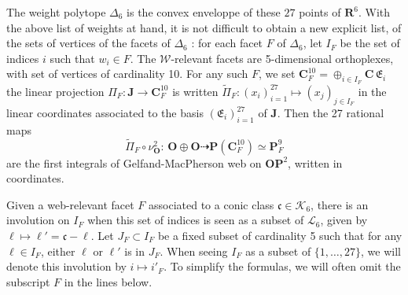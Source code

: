 \documentclass[11pt]{amsart}
\begin{document}
The weight polytope $\Delta_6$ is the convex enveloppe of these $27$ points of $\mathbf R^6$.  With the above list of weights at hand, it is not difficult to obtain a new explicit list, of the sets of vertices of the facets of 
$\Delta_6$ : for each facet $F$ of $\Delta_6$, let $I_F$ be the set of indices 
$i$ such that $w_i\in F$.  The $\boldsymbol{\mathcal W}$-relevant facets are 5-dimensional orthoplexes, with set of vertices of cardinality 10. 
 For any such $F$, we set $\mathbf C_F^{10}=\oplus_{i\in I_F} \mathbf C\,\mathfrak E_i$
  the linear projection $\Pi_F: \mathbf J\rightarrow  \mathbf C^{10}_F$ is written $\tilde \Pi_F: (x_i)_{i=1}^{27}\longmapsto (x_j)_{j\in I_F}$ in the linear coordinates associated to the basis $(\mathfrak E_i)_{i=1}^{27}$ of $\mathbf J$.  Then the 27 rational maps 
 $$
 \tilde \Pi_F \circ \nu_{\mathbf O}^2 : \, 
 {\mathbf O}\oplus {\mathbf O} \dashrightarrow \mathbf P(\mathbf C^{10}_F)\simeq \mathbf P^9_F
 $$
 are the first integrals of Gelfand-MacPherson web on $\mathbf O\mathbf P^2$, written in coordinates. 
 
 Given a web-relevant facet $F$ associated to a conic class $\boldsymbol{\mathfrak c}\in \boldsymbol{\mathcal K}_6$, 
 there is an involution  on $ I_F$ when this set of indices is seen as a subset of $\boldsymbol{\mathcal L}_6$, given by $\ell\mapsto \ell'=\boldsymbol{\mathfrak c}-\ell$. Let $J_F\subset I_F$ be a fixed  subset of cardinality 5 such that for any $\ell\in I_F$, either $\ell$ or $\ell'$ is in $J_F$. When seeing $I_F$ as a subset of $\{1,\ldots,27\}$, we will denote this involution by $i\mapsto i'_F$. To simplify the formulas, we will often omit 
the subscript $F$ in the lines below.  
 
\end{document}
